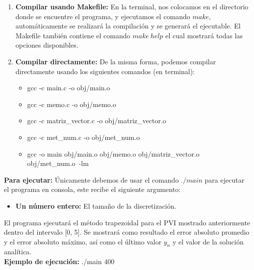 \documentclass[12pt]{article}
\begin{document}
\begin{enumerate}
	\item \textbf{Compilar usando Makefile:} En la terminal, nos colocamos en el directorio donde se encuentre el programa, y ejecutamos el comando $make$, automáticamente se realizará la compilación y se generará el ejecutable. El Makefile también contiene el comando $make\ help$ el cual mostrará todas las opciones disponibles.
	\item \textbf{Compilar directamente:} De la misma forma, podemos compilar directamente usando los siguientes comandos (en terminal):
	\begin{itemize}
		\item gcc -c main.c -o obj/main.o
		\item gcc -c memo.c -o obj/memo.o
		\item gcc -c matriz\_vector.c -o obj/matriz\_vector.o
		\item gcc -c met\_num.c -o obj/met\_num.o
		\item gcc -o main obj/main.o obj/memo.o obj/matriz\_vector.o obj/met\_num.o\ -lm
	\end{itemize}
\end{enumerate}

\textbf{Para ejecutar:} Únicamente debemos de usar el comando $./main$ para ejecutar el programa en consola, este recibe el siguiente argumento:
\begin{itemize}
	\item \textbf{Un número entero:} El tamaño de la discretización.
\end{itemize}

El programa ejecutará el método trapezoidal para el PVI mostrado anteriormente dentro del intervalo [0, 5]. Se mostrará como resultado el error absoluto promedio y el error absoluto máximo, así como el último valor $y_n$ y el valor de la solución analítica.\\

\textbf{Ejemplo de ejecución:} ./main 400\\
\end{document}
